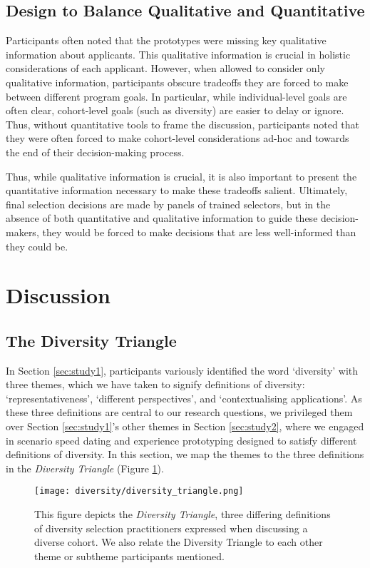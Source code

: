 \subsection{Design to Balance Qualitative and Quantitative}
Participants often noted that the prototypes were missing key qualitative information about applicants. This qualitative information is crucial in holistic considerations of each applicant. However, when allowed to consider only qualitative information, participants obscure tradeoffs they are forced to make between different program goals. In particular, while individual-level goals are often clear, cohort-level goals (such as diversity) are easier to delay or ignore. Thus, without quantitative tools to frame the discussion, participants noted that they were often forced to make cohort-level considerations ad-hoc and towards the end of their decision-making process.

Thus, while qualitative information is crucial, it is also important to present the quantitative information necessary to make these tradeoffs salient. Ultimately, final selection decisions are made by panels of trained selectors, but in the absence of both quantitative and qualitative information to guide these decision-makers, they would be forced to make decisions that are less well-informed than they could be.

\section{Discussion}\label{sec:disc}
\subsection{The Diversity Triangle}
In Section \ref{sec:study1}, participants variously identified the word `diversity' with three themes, which we have taken to signify definitions of diversity: `representativeness', `different perspectives', and `contextualising applications'. As these three definitions are central to our research questions, we privileged them over Section \ref{sec:study1}'s other themes in Section \ref{sec:study2}, where we engaged in scenario speed dating and experience prototyping designed to satisfy different definitions of diversity. In this section, we map the themes to the three definitions in the \emph{Diversity Triangle} (Figure \ref{fig:div_triangle}).

\begin{figure}[htbp]
    \centering
    \texttt{[image: diversity/diversity\_triangle.png]}
    \caption{This figure depicts the \emph{Diversity Triangle}, three differing definitions of diversity selection practitioners expressed when discussing a diverse cohort. We also relate the Diversity Triangle to each other theme or subtheme participants mentioned.}
    \label{fig:div_triangle}
\end{figure}

